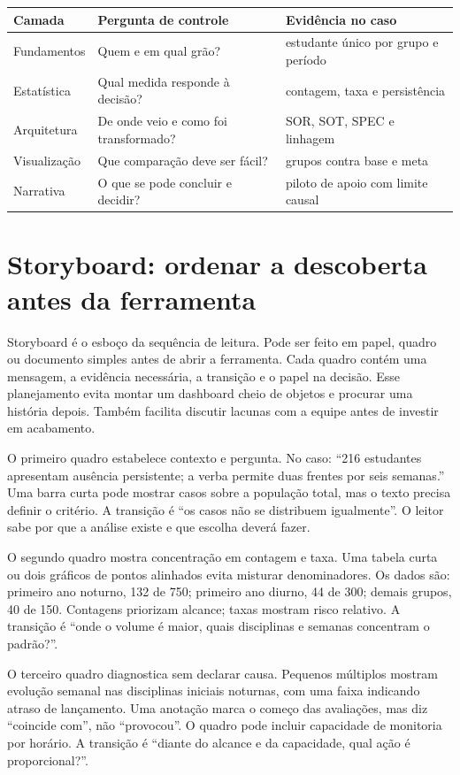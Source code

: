 \begin{center}
\begin{tabularx}{\textwidth}{p{2.6cm}Y Y}
\toprule
Camada & Pergunta de controle & Evidência no caso \\
\midrule
Fundamentos & Quem e em qual grão? & estudante único por grupo e período \\
Estatística & Qual medida responde à decisão? & contagem, taxa e persistência \\
Arquitetura & De onde veio e como foi transformado? & SOR, SOT, SPEC e linhagem \\
Visualização & Que comparação deve ser fácil? & grupos contra base e meta \\
Narrativa & O que se pode concluir e decidir? & piloto de apoio com limite causal \\
\bottomrule
\end{tabularx}
\end{center}

\section{Storyboard: ordenar a descoberta antes da ferramenta}

Storyboard é o esboço da sequência de leitura. Pode ser feito em papel, quadro ou documento simples antes de abrir a ferramenta. Cada quadro contém uma mensagem, a evidência necessária, a transição e o papel na decisão. Esse planejamento evita montar um dashboard cheio de objetos e procurar uma história depois. Também facilita discutir lacunas com a equipe antes de investir em acabamento.

O primeiro quadro estabelece contexto e pergunta. No caso: ``216 estudantes apresentam ausência persistente; a verba permite duas frentes por seis semanas.'' Uma barra curta pode mostrar casos sobre a população total, mas o texto precisa definir o critério. A transição é ``os casos não se distribuem igualmente''. O leitor sabe por que a análise existe e que escolha deverá fazer.

O segundo quadro mostra concentração em contagem e taxa. Uma tabela curta ou dois gráficos de pontos alinhados evita misturar denominadores. Os dados são: primeiro ano noturno, 132 de 750; primeiro ano diurno, 44 de 300; demais grupos, 40 de 150. Contagens priorizam alcance; taxas mostram risco relativo. A transição é ``onde o volume é maior, quais disciplinas e semanas concentram o padrão?''.

O terceiro quadro diagnostica sem declarar causa. Pequenos múltiplos mostram evolução semanal nas disciplinas iniciais noturnas, com uma faixa indicando atraso de lançamento. Uma anotação marca o começo das avaliações, mas diz ``coincide com'', não ``provocou''. O quadro pode incluir capacidade de monitoria por horário. A transição é ``diante do alcance e da capacidade, qual ação é proporcional?''.

